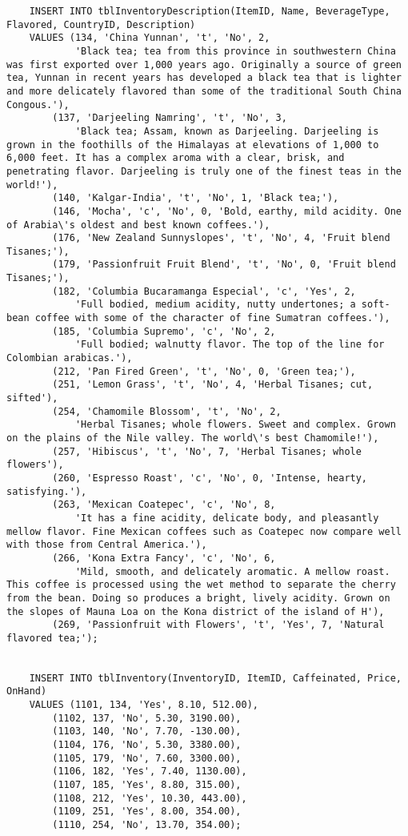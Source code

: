 \documentclass[12pt,titlepage]{article}
\begin{document}
\begin{verbatim}
    INSERT INTO tblInventoryDescription(ItemID, Name, BeverageType, Flavored, CountryID, Description)
    VALUES (134, 'China Yunnan', 't', 'No', 2,
            'Black tea; tea from this province in southwestern China was first exported over 1,000 years ago. Originally a source of green tea, Yunnan in recent years has developed a black tea that is lighter and more delicately flavored than some of the traditional South China Congous.'),
        (137, 'Darjeeling Namring', 't', 'No', 3,
            'Black tea; Assam, known as Darjeeling. Darjeeling is grown in the foothills of the Himalayas at elevations of 1,000 to 6,000 feet. It has a complex aroma with a clear, brisk, and penetrating flavor. Darjeeling is truly one of the finest teas in the world!'),
        (140, 'Kalgar-India', 't', 'No', 1, 'Black tea;'),
        (146, 'Mocha', 'c', 'No', 0, 'Bold, earthy, mild acidity. One of Arabia\'s oldest and best known coffees.'),
        (176, 'New Zealand Sunnyslopes', 't', 'No', 4, 'Fruit blend Tisanes;'),
        (179, 'Passionfruit Fruit Blend', 't', 'No', 0, 'Fruit blend Tisanes;'),
        (182, 'Columbia Bucaramanga Especial', 'c', 'Yes', 2,
            'Full bodied, medium acidity, nutty undertones; a soft-bean coffee with some of the character of fine Sumatran coffees.'),
        (185, 'Columbia Supremo', 'c', 'No', 2,
            'Full bodied; walnutty flavor. The top of the line for Colombian arabicas.'),
        (212, 'Pan Fired Green', 't', 'No', 0, 'Green tea;'),
        (251, 'Lemon Grass', 't', 'No', 4, 'Herbal Tisanes; cut, sifted'),
        (254, 'Chamomile Blossom', 't', 'No', 2,
            'Herbal Tisanes; whole flowers. Sweet and complex. Grown on the plains of the Nile valley. The world\'s best Chamomile!'),
        (257, 'Hibiscus', 't', 'No', 7, 'Herbal Tisanes; whole flowers'),
        (260, 'Espresso Roast', 'c', 'No', 0, 'Intense, hearty, satisfying.'),
        (263, 'Mexican Coatepec', 'c', 'No', 8,
            'It has a fine acidity, delicate body, and pleasantly mellow flavor. Fine Mexican coffees such as Coatepec now compare well with those from Central America.'),
        (266, 'Kona Extra Fancy', 'c', 'No', 6,
            'Mild, smooth, and delicately aromatic. A mellow roast. This coffee is processed using the wet method to separate the cherry from the bean. Doing so produces a bright, lively acidity. Grown on the slopes of Mauna Loa on the Kona district of the island of H'),
        (269, 'Passionfruit with Flowers', 't', 'Yes', 7, 'Natural flavored tea;');


    INSERT INTO tblInventory(InventoryID, ItemID, Caffeinated, Price, OnHand)
    VALUES (1101, 134, 'Yes', 8.10, 512.00),
        (1102, 137, 'No', 5.30, 3190.00),
        (1103, 140, 'No', 7.70, -130.00),
        (1104, 176, 'No', 5.30, 3380.00),
        (1105, 179, 'No', 7.60, 3300.00),
        (1106, 182, 'Yes', 7.40, 1130.00),
        (1107, 185, 'Yes', 8.80, 315.00),
        (1108, 212, 'Yes', 10.30, 443.00),
        (1109, 251, 'Yes', 8.00, 354.00),
        (1110, 254, 'No', 13.70, 354.00);


\end{verbatim}
\end{document}
